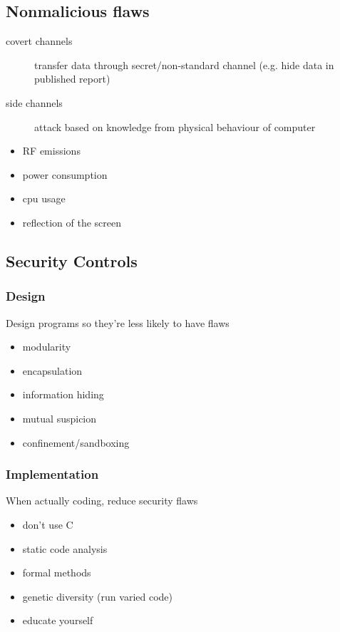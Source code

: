 \documentclass[]{article}
\theoremstyle{definition}
\begin{document}
	\subsection{Nonmalicious flaws}
	\begin{description}
		\item[covert channels] transfer data through secret/non-standard channel (e.g. hide data in published report)
		\item[side channels] attack based on knowledge from physical behaviour of computer 
	\end{description}
	\begin{itemize}
		\item RF emissions
		\item power consumption
		\item cpu usage
		\item reflection of the screen
	\end{itemize}

	\subsection{Security Controls}
	\subsubsection{Design}
	Design programs so they're less likely to have flaws
	\begin{itemize}
		\item modularity
		\item encapsulation
		\item information hiding
		\item mutual suspicion
		\item confinement/sandboxing
	\end{itemize}

	\subsubsection{Implementation}
	When actually coding, reduce security flaws
	\begin{itemize}
		\item don't use C
		\item static code analysis
		\item formal methods
		\item genetic diversity (run varied code)
		\item educate yourself
	\end{itemize}
\end{document}
